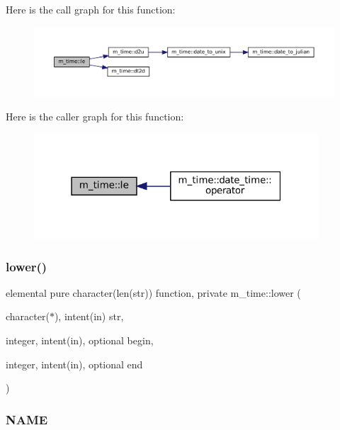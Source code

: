 Here is the call graph for this function\+:\nopagebreak
\begin{figure}[H]
\begin{center}
\leavevmode
\includegraphics[width=350pt]{namespacem__time_a498bb2830d153743d9624e65e92d4f6c_cgraph}
\end{center}
\end{figure}
Here is the caller graph for this function\+:\nopagebreak
\begin{figure}[H]
\begin{center}
\leavevmode
\includegraphics[width=301pt]{namespacem__time_a498bb2830d153743d9624e65e92d4f6c_icgraph}
\end{center}
\end{figure}
\mbox{\label{namespacem__time_a96597ff2f2eab2ede14e3a63bd49254a}} 
\subsubsection{\texorpdfstring{lower()}{lower()}}
{\footnotesize\ttfamily elemental pure character(len(str)) function, private m\+\_\+time\+::lower (\begin{DoxyParamCaption}\item[{character($\ast$), intent(in)}]{str,  }\item[{integer, intent(in), optional}]{begin,  }\item[{integer, intent(in), optional}]{end }\end{DoxyParamCaption})\hspace{0.3cm}{\ttfamily [private]}}



\subsubsection*{N\+A\+ME}

